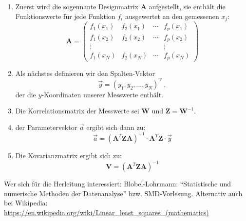 \documentclass{scrartcl}
\begin{document}
\begin{enumerate}
    \item Zuerst wird die sogennante Designmatrix $\mathbf{A}$ aufgestellt, sie enthält die Funktionswerte für jede Funktion $f_i$ ausgewertet an den gemessenen $x_j$:
        \begin{equation}
            \mathbf{A} = 
            \begin{pmatrix}
                f_1(x_1) & f_2(x_1) & \cdots & f_p(x_1) \\  
                f_1(x_2) & f_2(x_2) & \cdots & f_p(x_2) \\  
                \vdots   &          &        &  \vdots  \\
                f_1(x_N) & f_2(x_N) & \cdots & f_p(x_N) 
            \end{pmatrix}
        \end{equation}
    \item Als nächstes definieren wir den Spalten-Vektor 
        \begin{equation}
            \vec{y} = (y_1, y_2, …, y_N)^\mathrm{T} \ ,
        \end{equation}
        der die $y$-Koordinaten unserer Messwerte enthält.
    \item Die Korrelationsmatrix der Messwerte sei $\mathbf{W}$ und $\mathbf{Z} = \mathbf{W}^{-1}$.
    \item der Parametervektor $\vec{a}$ ergibt sich dann zu:
        \begin{equation}
            \vec{a} = \left(\mathbf{A}^T \mathbf{Z} \mathbf{A}\right)^{-1} \cdot \mathbf{A}^T \mathbf{Z} \cdot \vec{y}
        \end{equation}

    \item Die Kovarianzmatrix ergibt sich zu:
        \begin{equation}
            \mathbf{V} = \left(\mathbf{A}^T \mathbf{Z} \mathbf{A}\right)^{-1}
        \end{equation}
\end{enumerate}
Wer sich für die Herleitung interessiert: Blobel-Lohrmann: \enquote{Statistische und numerische Methoden der Datenanalyse} bzw. SMD-Vorlesung.
Alternativ auch bei Wikipedia: \url{https://en.wikipedia.org/wiki/Linear_least_squares_(mathematics)}
\end{document}
